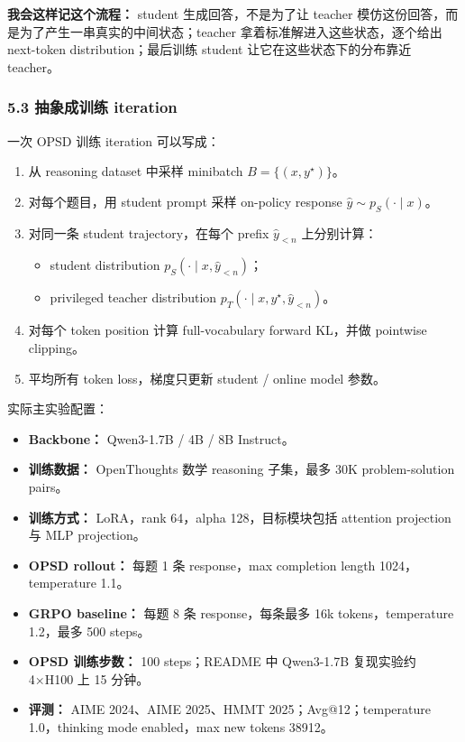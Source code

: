 \begin{summarybox}
\textbf{我会这样记这个流程：} student 生成回答，不是为了让 teacher 模仿这份回答，而是为了产生一串真实的中间状态；teacher 拿着标准解进入这些状态，逐个给出 next-token distribution；最后训练 student 让它在这些状态下的分布靠近 teacher。
\end{summarybox}

\subsubsection{5.3 抽象成训练 iteration}

一次 OPSD 训练 iteration 可以写成：

\begin{enumerate}[leftmargin=1.5em]
  \item 从 reasoning dataset 中采样 minibatch $B=\{(x,y^\star)\}$。
  \item 对每个题目，用 student prompt 采样 on-policy response $\hat{y}\sim p_S(\cdot\mid x)$。
  \item 对同一条 student trajectory，在每个 prefix $\hat{y}_{<n}$ 上分别计算：
    \begin{itemize}[leftmargin=1.5em]
      \item student distribution $p_S(\cdot\mid x,\hat{y}_{<n})$；
      \item privileged teacher distribution $p_T(\cdot\mid x,y^\star,\hat{y}_{<n})$。
    \end{itemize}
  \item 对每个 token position 计算 full-vocabulary forward KL，并做 pointwise clipping。
  \item 平均所有 token loss，梯度只更新 student / online model 参数。
\end{enumerate}

实际主实验配置：

\begin{itemize}[leftmargin=1.5em]
  \item \textbf{Backbone：} Qwen3-1.7B / 4B / 8B Instruct。
  \item \textbf{训练数据：} OpenThoughts 数学 reasoning 子集，最多 30K problem-solution pairs。
  \item \textbf{训练方式：} LoRA，rank 64，alpha 128，目标模块包括 attention projection 与 MLP projection。
  \item \textbf{OPSD rollout：} 每题 1 条 response，max completion length 1024，temperature 1.1。
  \item \textbf{GRPO baseline：} 每题 8 条 response，每条最多 16k tokens，temperature 1.2，最多 500 steps。
  \item \textbf{OPSD 训练步数：} 100 steps；README 中 Qwen3-1.7B 复现实验约 4×H100 上 15 分钟。
  \item \textbf{评测：} AIME 2024、AIME 2025、HMMT 2025；Avg@12；temperature 1.0，thinking mode enabled，max new tokens 38912。
\end{itemize}

